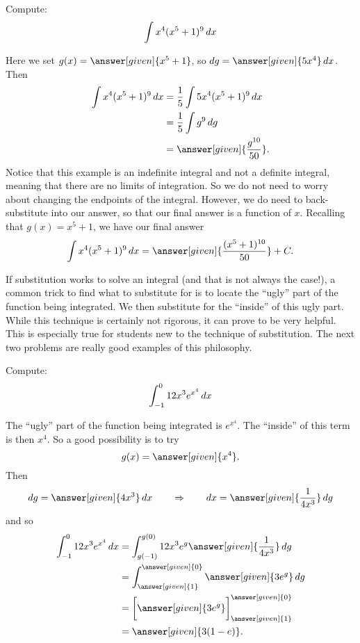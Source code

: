 \documentclass{ximera}
\begin{document}
\begin{example}
Compute:
\[
\int x^4(x^5+1)^{9} \mathop{}\!d x
\]
\begin{explanation}
Here we set $g(x) =  \answer[given]{x^5+1}$, so $\d g =  \answer[given]{5x^4} \d x$.  Then
\begin{align*}
  \int x^4(x^5+1)^{9} \d x &= \frac{1}{5} \int 5x^4 (x^5+1)^{9} \d x \\
  &= \frac{1}{5} \int g^{9} \d g\\
&= \answer[given]{\frac{g^{10}}{50}}.
\end{align*}
Notice that this example is an indefinite integral and not a definite
integral, meaning that there are no limits of integration.  So we do
not need to worry about changing the endpoints of the integral.  However,
we do need to back-substitute into our answer, so that our final
answer is a function of $x$.  Recalling that $g(x) = x^5+1$, we have
our final answer
\[
\int x^4(x^5+1)^{9} \d x= \answer[given]{\frac{(x^5+1)^{10}}{50}}+C.
\]
\end{explanation}
\end{example}


If substitution works to solve an integral (and that is not always the
case!), a common trick to find what to substitute for is to locate the
``ugly'' part of the function being integrated.  We then substitute
for the ``inside'' of this ugly part.  While this technique is
certainly not rigorous, it can prove to be very helpful.  This is
especially true for students new to the technique of substitution.
The next two problems are really good examples of this philosophy.

\begin{example}
Compute:
\[
\int_{-1}^0 12x^3 e^{x^4} \mathop{}\!d x
\]
\begin{explanation}
The ``ugly'' part of the function being integrated is $e^{x^4}$.  The
``inside'' of this term is then $x^4$.  So a good possibility is to
try
\[
g(x) =  \answer[given]{x^4}.
\]
Then
\[
\d g =  \answer[given]{4x^3} \d x 	\qquad	\Rightarrow	\qquad	\d x = \answer[given]{\frac{1}{4x^3}} \d g
\]
and so
\begin{align*}
\int_{-1}^0 12x^3 e^{x^4} \d x &= \int_{g(-1)}^{g(0)} 12 x^3 e^g \answer[given]{\frac{1}{4x^3}} \d g  \\
&= \int_{\answer[given]{1}}^{\answer[given]{0}} \answer[given]{3 e^g} \d g  \\
&= \eval{\answer[given]{3e^g}}_{\answer[given]{1}}^{\answer[given]{0}}  \\
&= \answer[given]{3(1-e)}.
\end{align*}
\end{explanation}
\end{example}
\end{document}

